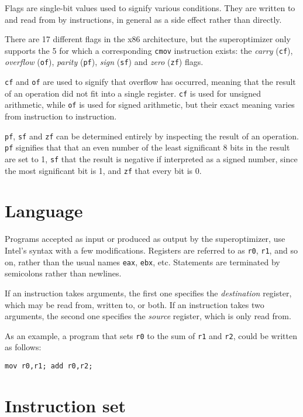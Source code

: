 \documentclass[a4paper,11pt]{kth-mag}
\begin{document}
Flags are single-bit values used to signify various conditions.
They are written to and read from by instructions, in general as a side effect rather than directly.

There are 17 different flags in the x86 architecture, but the superoptimizer only supports the 5 for which a corresponding \verb|cmov| instruction exists:
the \emph{carry} (\verb|cf|), \emph{overflow} (\verb|of|), \emph{parity} (\verb|pf|), \emph{sign} (\verb|sf|) and \emph{zero} (\verb|zf|) flags.

\verb|cf| and \verb|of| are used to signify that overflow has occurred, meaning that the result of an operation did not fit into a single register.
\verb|cf| is used for unsigned arithmetic, while \verb|of| is used for signed arithmetic, but their exact meaning varies from instruction to instruction.

\verb|pf|, \verb|sf| and \verb|zf| can be determined entirely by inspecting the result of an operation.
\verb|pf| signifies that that an even number of the least significant 8 bits in the result are set to 1,
\verb|sf| that the result is negative if interpreted as a signed number, since the most significant bit is 1,
and \verb|zf| that every bit is 0.

\section{Language}
\label{s:language}

Programs accepted as input or produced as output by the superoptimizer, use Intel's syntax with a few modifications.
Registers are referred to as \verb|r0|, \verb|r1|, and so on, rather than the usual names \verb|eax|, \verb|ebx|, etc.
Statements are terminated by semicolons rather than newlines.

If an instruction takes arguments, the first one specifies the \emph{destination} register, which may be read from, written to, or both.
If an instruction takes two arguments, the second one specifies the \emph{source} register, which is only read from.

As an example, a program that sets \verb|r0| to the sum of \verb|r1| and \verb|r2|, could be written as follows:

\begin{verbatim}
mov r0,r1; add r0,r2;
\end{verbatim}

\section{Instruction set}
\end{document}
